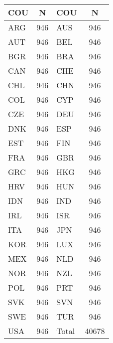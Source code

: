 \begin{table}[H]
\footnotesize
\centering\caption{N. obs / COU in structural RCA sample}
{
\def\sym#1{\ifmmode^{#1}\else\(^{#1}\)\fi}
\begin{longtable}{l*{1}{c}l*{1}{c}}
\toprule\endfirsthead\midrule\endhead\midrule\endfoot\endlastfoot
  COU             &\multicolumn{1}{c}{N} &COU             &\multicolumn{1}{c}{N}\\
\midrule
\midrule
ARG         &         946        & 
AUS         &         946         \\
\addlinespace
AUT         &         946        & 
BEL         &         946         \\
\addlinespace
BGR         &         946        & 
BRA         &         946         \\
\addlinespace
CAN         &         946        & 
CHE         &         946         \\
\addlinespace
CHL         &         946        & 
CHN         &         946         \\
\addlinespace
COL         &         946        & 
CYP         &         946         \\
\addlinespace
CZE         &         946        & 
DEU         &         946         \\
\addlinespace
DNK         &         946        & 
ESP         &         946         \\
\addlinespace
EST         &         946        & 
FIN         &         946         \\
\addlinespace
FRA         &         946        & 
GBR         &         946         \\
\addlinespace
GRC         &         946        & 
HKG         &         946         \\
\addlinespace
HRV         &         946        & 
HUN         &         946         \\
\addlinespace
IDN         &         946        & 
IND         &         946         \\
\addlinespace
IRL         &         946        & 
ISR         &         946         \\
\addlinespace
ITA         &         946        & 
JPN         &         946         \\
\addlinespace
KOR         &         946        & 
LUX         &         946         \\
\addlinespace
MEX         &         946        & 
NLD         &         946         \\
\addlinespace
NOR         &         946        & 
NZL         &         946         \\
\addlinespace
POL         &         946        & 
PRT         &         946         \\
\addlinespace
SVK         &         946        & 
SVN         &         946         \\
\addlinespace
SWE         &         946        & 
TUR         &         946         \\
\addlinespace
USA         &         946        & 
Total       &       40678         \\
\bottomrule
\end{longtable}
}
\end{table}
